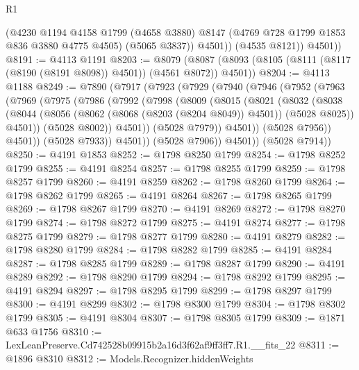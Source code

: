 \begin{lexlean}{R1}
\begin{coremodule}
              (@4230
                @1194
                @4158
                @1799
                (@4658 @3880)
                @8147
                (@4769 @728 @1799 @1853 @836 @3880 @4775 @4505)
                (@5065 @3837))
              @4501))
          (@4535 @8121))
        @4501))
@8191 := @4113 @1191
@8203 := @8079
    (@8087 (@8093 (@8105 (@8111 (@8117 (@8190 (@8191 @8098)) @4501)) (@4561 @8072)) @4501))
@8204 := @4113 @1188
@8249 := @7890
    (@7917
      (@7923
        (@7929
          (@7940
            (@7946
              (@7952
                (@7963
                  (@7969
                    (@7975
                      (@7986
                        (@7992
                          (@7998
                            (@8009
                              (@8015
                                (@8021
                                  (@8032
                                    (@8038
                                      (@8044
                                        (@8056
                                          (@8062 (@8068 (@8203 (@8204 @8049)) @4501))
                                          (@5028 @8025))
                                        @4501))
                                    (@5028 @8002))
                                  @4501))
                              (@5028 @7979))
                            @4501))
                        (@5028 @7956))
                      @4501))
                  (@5028 @7933))
                @4501))
            (@5028 @7906))
          @4501))
      (@5028 @7914))
@8250 := @4191 @1853
@8252 := @1798 @8250 @1799
@8254 := @1798 @8252 @1799
@8255 := @4191 @8254
@8257 := @1798 @8255 @1799
@8259 := @1798 @8257 @1799
@8260 := @4191 @8259
@8262 := @1798 @8260 @1799
@8264 := @1798 @8262 @1799
@8265 := @4191 @8264
@8267 := @1798 @8265 @1799
@8269 := @1798 @8267 @1799
@8270 := @4191 @8269
@8272 := @1798 @8270 @1799
@8274 := @1798 @8272 @1799
@8275 := @4191 @8274
@8277 := @1798 @8275 @1799
@8279 := @1798 @8277 @1799
@8280 := @4191 @8279
@8282 := @1798 @8280 @1799
@8284 := @1798 @8282 @1799
@8285 := @4191 @8284
@8287 := @1798 @8285 @1799
@8289 := @1798 @8287 @1799
@8290 := @4191 @8289
@8292 := @1798 @8290 @1799
@8294 := @1798 @8292 @1799
@8295 := @4191 @8294
@8297 := @1798 @8295 @1799
@8299 := @1798 @8297 @1799
@8300 := @4191 @8299
@8302 := @1798 @8300 @1799
@8304 := @1798 @8302 @1799
@8305 := @4191 @8304
@8307 := @1798 @8305 @1799
@8309 := @1871 @633 @1756
@8310 := LexLeanPreserve.Cd742528b09915b2a16d3f62af9ff3ff7.R1.__fits_22
@8311 := @1896 @8310
@8312 := Models.Recognizer.hiddenWeights

\end{coremodule}
\end{lexlean}

